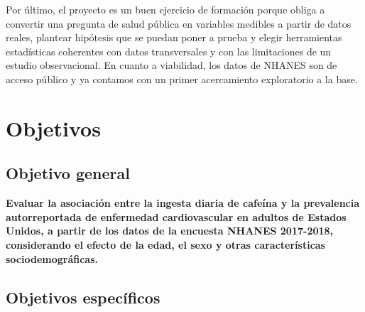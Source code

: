 \documentclass[
  spanish,
  12pt,
]{article}
\begin{document}
Por último, el proyecto es un buen ejercicio de formación porque obliga
a convertir una pregunta de salud pública en variables medibles a
partir de datos reales, plantear hipótesis que se puedan poner a
prueba y elegir herramientas estadísticas coherentes con datos
transversales y con las limitaciones de un estudio observacional. En
cuanto a viabilidad, los datos de NHANES son de acceso público y ya
contamos con un primer acercamiento exploratorio a la base.

\section{Objetivos}\label{objetivos}

\subsection{Objetivo general}\label{objetivo-general}

\textbf{Evaluar la asociación entre la ingesta diaria de cafeína y la
prevalencia autorreportada de enfermedad cardiovascular en adultos de
Estados Unidos, a partir de los datos de la encuesta NHANES 2017-2018,
considerando el efecto de la edad, el sexo y otras características
sociodemográficas.}

\subsection{Objetivos específicos}\label{objetivos-especuxedficos}
\end{document}

